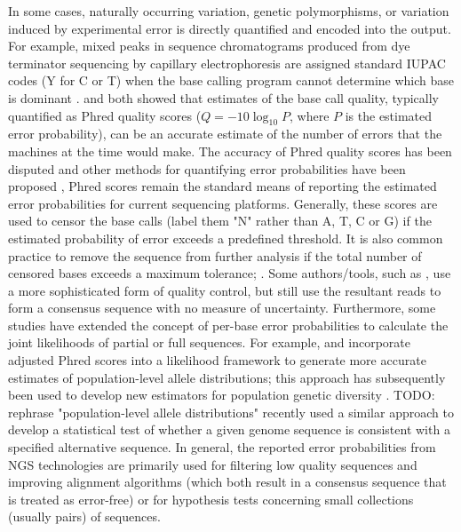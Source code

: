 \documentclass[10pt]{article}
\begin{document}
In some cases, naturally occurring variation, \ie genetic polymorphisms, or variation induced by experimental error is directly quantified and encoded into the output.
For example, mixed peaks in sequence chromatograms produced from dye terminator sequencing by capillary electrophoresis are assigned standard IUPAC codes (\eg Y for C or T) when the base calling program cannot determine which base is dominant \citep{NomenclatureIncompletelySpecified1986}.
\citet{ewingBaseCallingAutomatedSequencer1998} and \citet{richterichEstimationErrorsRaw1998} both showed that estimates of the base call quality, typically quantified as Phred quality scores ($Q=-10 \log_{10} P$, where $P$ is the estimated error probability), can be an accurate estimate of the number of errors that the machines at the time would make.
The accuracy of Phred quality scores has been disputed and other methods for quantifying error probabilities have been proposed \citep{liAdjustQualityScores2004, depristoFrameworkVariationDiscovery2011, liSNPDetectionMassively2009}, Phred scores remain the standard means of reporting the estimated error probabilities for current sequencing platforms.
Generally, these scores are used to censor the base calls (\ie label them "N" rather than A, T, C or G) if the estimated probability of error exceeds a predefined threshold.
It is also common practice to remove the sequence from further analysis if the total number of censored bases exceeds a maximum tolerance; \eg \citet{doroninaPhylogeneticPositionEmended2005, robaskyRoleReplicatesError2014,oraweAccountingUncertaintyDNA2015}.
Some authors/tools, such as \citet{lippiPotentialPreanalyticalAnalytical2020}, use a more sophisticated form of quality control, but still use the resultant reads to form a consensus sequence with no measure of uncertainty.
Furthermore, some studies have extended the concept of per-base error probabilities to calculate the joint likelihoods of partial or full sequences.
For example, \citet{depristoFrameworkVariationDiscovery2011} and \citet{gompertHierarchicalBayesianModel2011} incorporate adjusted Phred scores into a likelihood framework to generate more accurate estimates of population-level allele distributions; this approach has subsequently been used to develop new estimators for population genetic diversity \citep{fumagalliQuantifyingPopulationGenetic2013a}. TODO: rephrase "population-level allele distributions"
\citet{kuoEAGLEExplicitAlternative2018} recently used a similar approach to develop a statistical test of whether a given genome sequence is consistent with a specified alternative sequence.
In general, the reported error probabilities from NGS technologies are primarily used for filtering low quality sequences and improving alignment algorithms (which both result in a consensus sequence that is treated as error-free) or for hypothesis tests concerning small collections (usually pairs) of sequences.
\end{document}
